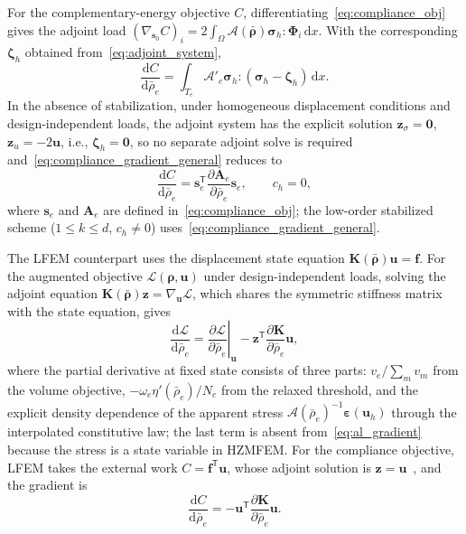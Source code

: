 For the complementary-energy objective $C$, differentiating~\eqref{eq:compliance_obj} gives the adjoint load $(\nabla_{\boldsymbol{s}_0} C)_i = 2\int_\Omega \mathcal{A}(\bar{\boldsymbol{\rho}}) \boldsymbol{\sigma}_h : \boldsymbol{\Phi}_i \,\mathrm{d}x$. With the corresponding $\boldsymbol{\zeta}_h$ obtained from~\eqref{eq:adjoint_system},
\begin{equation}
\label{eq:compliance_gradient_general}
\frac{\mathrm{d}C}{\mathrm{d}\bar{\rho}_e}
= \int_{T_e} \mathcal{A}'_e \boldsymbol{\sigma}_h : (\boldsymbol{\sigma}_h - \boldsymbol{\zeta}_h) \,\mathrm{d}x.
\end{equation}
In the absence of stabilization, under homogeneous displacement conditions and design-independent loads, the adjoint system has the explicit solution $\boldsymbol{z}_\sigma = \boldsymbol{0}$, $\boldsymbol{z}_u = -2\boldsymbol{u}$, i.e., $\boldsymbol{\zeta}_h = \boldsymbol{0}$, so no separate adjoint solve is required and~\eqref{eq:compliance_gradient_general} reduces to
\begin{equation}
\label{eq:compliance_gradient_explicit}
\frac{\mathrm{d}C}{\mathrm{d}\bar{\rho}_e}
= \boldsymbol{s}_e^{\mathsf T} \frac{\partial \boldsymbol{A}_e}{\partial \bar{\rho}_e} \boldsymbol{s}_e,
\qquad c_h = 0,
\end{equation}
where $\boldsymbol{s}_e$ and $\boldsymbol{A}_e$ are defined in~\eqref{eq:compliance_obj}; the low-order stabilized scheme ($1 \le k \le d$, $c_h \ne 0$) uses~\eqref{eq:compliance_gradient_general}.

The LFEM counterpart uses the displacement state equation $\boldsymbol{K}(\bar{\boldsymbol{\rho}}) \boldsymbol{u} = \boldsymbol{f}$. For the augmented objective $\mathcal{L}(\boldsymbol{\rho}, \boldsymbol{u})$ under design-independent loads, solving the adjoint equation $\boldsymbol{K}(\bar{\boldsymbol{\rho}}) \boldsymbol{z} = \nabla_{\boldsymbol{u}} \mathcal{L}$, which shares the symmetric stiffness matrix with the state equation, gives
\begin{equation}
\label{eq:lfem_al_gradient}
\frac{\mathrm{d}\mathcal{L}}{\mathrm{d}\bar{\rho}_e}
= \left.\frac{\partial \mathcal{L}}{\partial \bar{\rho}_e}\right|_{\boldsymbol{u}}
- \boldsymbol{z}^{\mathsf T} \frac{\partial \boldsymbol{K}}{\partial \bar{\rho}_e} \boldsymbol{u},
\end{equation}
where the partial derivative at fixed state consists of three parts: $v_e/\sum_m v_m$ from the volume objective, $-\omega_e \eta'(\bar{\rho}_e)/N_e$ from the relaxed threshold, and the explicit density dependence of the apparent stress $\mathcal{A}(\bar{\rho}_e)^{-1} \boldsymbol{\varepsilon}(\boldsymbol{u}_h)$ through the interpolated constitutive law; the last term is absent from~\eqref{eq:al_gradient} because the stress is a state variable in HZMFEM. For the compliance objective, LFEM takes the external work $C = \boldsymbol{f}^{\mathsf T} \boldsymbol{u}$, whose adjoint solution is $\boldsymbol{z} = \boldsymbol{u}$~\cite{BendsoeSigmund2004}, and the gradient is
\begin{equation}
\label{eq:lfem_compliance_gradient}
\frac{\mathrm{d}C}{\mathrm{d}\bar{\rho}_e}
= -\boldsymbol{u}^{\mathsf T} \frac{\partial \boldsymbol{K}}{\partial \bar{\rho}_e} \boldsymbol{u}.
\end{equation}

